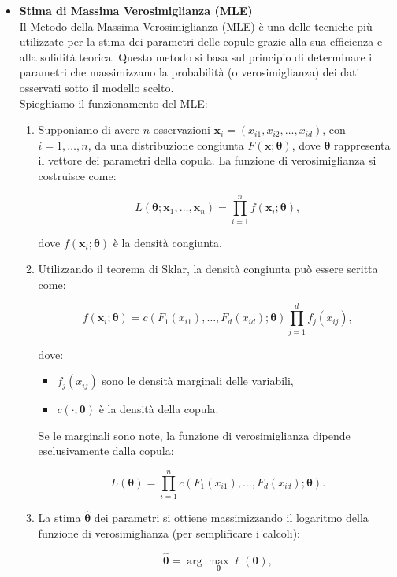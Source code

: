 \documentclass[a4paper,12pt]{article}
\begin{document}
\begin{itemize}
	\item \textbf{Stima di Massima Verosimiglianza (MLE)}\\
	Il Metodo della Massima Verosimiglianza (MLE) è una delle tecniche più utilizzate per la stima dei parametri delle copule grazie alla sua efficienza e alla solidità teorica. Questo metodo si basa sul principio di determinare i parametri che massimizzano la probabilità (o verosimiglianza) dei dati osservati sotto il modello scelto.\\
	\newpage
	Spieghiamo il funzionamento del MLE:
	\begin{enumerate}
		\item Supponiamo di avere \(n\) osservazioni \(\mathbf{x}_i = (x_{i1}, x_{i2}, \ldots, x_{id})\), con \(i = 1, \ldots, n\), da una distribuzione congiunta \(F(\mathbf{x}; \boldsymbol{\theta})\), dove \(\boldsymbol{\theta}\) rappresenta il vettore dei parametri della copula. La funzione di verosimiglianza si costruisce come:
		
		\[
		L(\boldsymbol{\theta}; \mathbf{x}_1, \ldots, \mathbf{x}_n) = \prod_{i=1}^n f(\mathbf{x}_i; \boldsymbol{\theta}),
		\]
		
		dove \(f(\mathbf{x}_i; \boldsymbol{\theta})\) è la densità congiunta.
		\item Utilizzando il teorema di Sklar, la densità congiunta può essere scritta come:
		
		\[
		f(\mathbf{x}_i; \boldsymbol{\theta}) = c(F_1(x_{i1}), \ldots, F_d(x_{id}); \boldsymbol{\theta}) \prod_{j=1}^d f_j(x_{ij}),
		\]
		
		dove:
		\begin{itemize}
			\item \(f_j(x_{ij})\) sono le densità marginali delle variabili,
			\item \(c(\cdot; \boldsymbol{\theta})\) è la densità della copula.
		\end{itemize}
		
		Se le marginali sono note, la funzione di verosimiglianza dipende esclusivamente dalla copula:
		
		\[
		L(\boldsymbol{\theta}) = \prod_{i=1}^n c(F_1(x_{i1}), \ldots, F_d(x_{id}); \boldsymbol{\theta}).
		\]
		\item La stima \(\hat{\boldsymbol{\theta}}\) dei parametri si ottiene massimizzando il logaritmo della funzione di verosimiglianza (per semplificare i calcoli):
		
		\[
		\hat{\boldsymbol{\theta}} = \arg\max_{\boldsymbol{\theta}} \ell(\boldsymbol{\theta}),
		\]
		

\end{enumerate}
\end{itemize}
\end{document}
